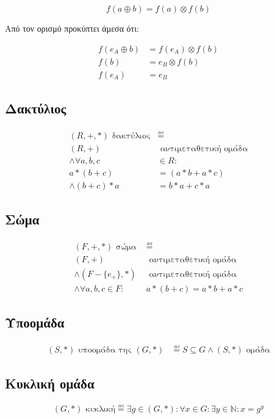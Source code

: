 \documentclass[11pt,a4paper]{book}
\newcommand{\defeq}{\overset{\underset{\mathrm{def}}{}}{=}}
\begin{document}
\[
	f( a \oplus b ) = f( a ) \otimes f( b )
\]

Από τον ορισμό προκύπτει άμεσα ότι:

\begin{align*}
    f( e_A \oplus b ) &= f( e_A ) \otimes f( b )\\
	f( b ) &= e_B \otimes f( b )\\
	f( e_A ) &= e_B
\end{align*}

\subsection*{Δακτύλιος}

\begin{align*}
(R, +, *) \text{ δακτύλιος} &\defeq\\
(R, +) &\text{ αντιμεταθετική ομάδα}\\
\land \forall a, b, c &\in R:\\
a * (b + c ) &= (a * b + a * c)\\
\land (b + c) * a &= b * a + c * a
\end{align*}

\subsection*{Σώμα}
\begin{align*}
(F, +, *) \text{ σώμα } &\defeq\\
(F, +) &\text{ αντιμεταθετική ομάδα }\\
\land (F - \{e_+\}, *) &\text{ αντιμεταθετική ομάδα }\\
\land \forall a, b, c \in F: &a * (b + c) = a * b + a * c
\end{align*}

\subsection*{Υποομάδα}
\begin{align*}
 (S, *) \text{ υποομάδα της } (G, *) &\defeq S \subseteq G \land (S, *) \text{ ομάδα}
\end{align*}

\subsection*{Κυκλική ομάδα}
\[
	( G, * ) \text{ κυκλική} \defeq \exists g \in (G, *): \forall x \in G: \exists y \in \mathbb{N}: x = g^y
\]
\end{document}
